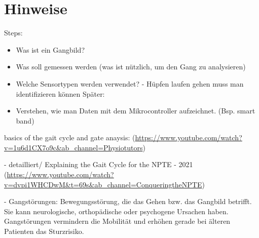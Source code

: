 %
%
%

\chapter{Hinweise}



Steps: 
\begin{itemize}
\item Was ist ein Gangbild?
\item Was soll gemessen werden  (was ist nützlich, um den Gang zu analysieren)
\item Welche Sensortypen werden verwendet? 
- Hüpfen laufen gehen muss man identifizieren können 
 Später: 

\item Verstehen, wie man Daten mit dem Mikrocontroller aufzeichnet. (Bsp. smart band) 
\end{itemize}
basics of the gait cycle and gate anaysis:  (\url {https://www.youtube.com/watch?v=1u6d1CX7o9c&ab_channel=Physiotutors})

- detailliert/ 
Explaining the Gait Cycle for the NPTE - 2021 (\url {https://www.youtube.com/watch?v=dvpi1WHCDwM&t=69s&ab_channel=ConqueringtheNPTE})


- Gangstörungen: Bewegungsstörung, die das Gehen bzw. das Gangbild betrifft. Sie kann neurologische, orthopädische oder psychogene Ursachen haben. Gangstörungen vermindern die Mobilität und erhöhen gerade bei älteren Patienten das Sturzrisiko.





